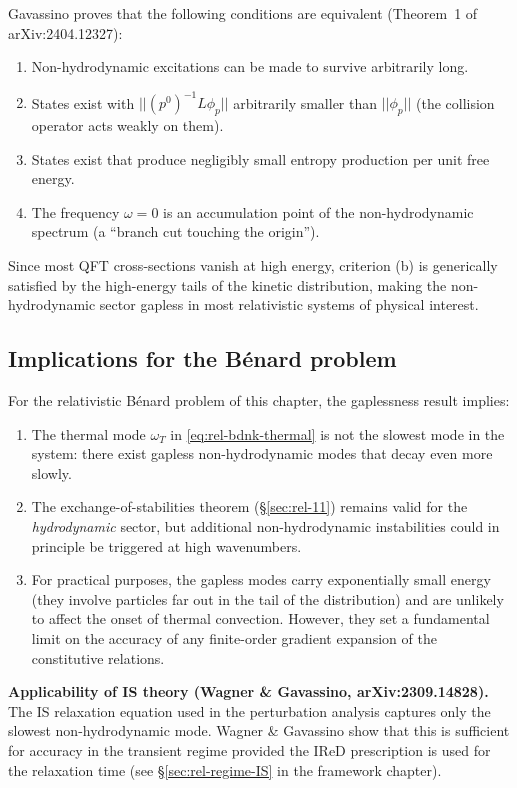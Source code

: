 Gavassino proves that the following conditions are equivalent (Theorem~1
of arXiv:2404.12327):
\begin{enumerate}
\item[(a)] Non-hydrodynamic excitations can be made to survive
  arbitrarily long.
\item[(b)] States exist with $||(p^0)^{-1}L\phi_p||$ arbitrarily
  smaller than $||\phi_p||$ (the collision operator acts weakly on them).
\item[(c)] States exist that produce negligibly small entropy production
  per unit free energy.
\item[(d)] The frequency $\omega = 0$ is an accumulation point of the
  non-hydrodynamic spectrum (a ``branch cut touching the origin'').
\end{enumerate}
Since most QFT cross-sections vanish at high energy, criterion (b) is
generically satisfied by the high-energy tails of the kinetic distribution,
making the non-hydrodynamic sector gapless in most relativistic systems
of physical interest.

\subsection{Implications for the B\'enard problem}

For the relativistic B\'enard problem of this chapter, the gaplessness
result implies:
\begin{enumerate}
\item The thermal mode $\omega_T$ in \eqref{eq:rel-bdnk-thermal} is
  not the slowest mode in the system: there exist gapless non-hydrodynamic
  modes that decay even more slowly.
\item The exchange-of-stabilities theorem (\S\ref{sec:rel-11}) remains
  valid for the \emph{hydrodynamic} sector, but additional non-hydrodynamic
  instabilities could in principle be triggered at high wavenumbers.
\item For practical purposes, the gapless modes carry exponentially
  small energy (they involve particles far out in the tail of the
  distribution) and are unlikely to affect the onset of thermal
  convection.  However, they set a fundamental limit on the accuracy
  of any finite-order gradient expansion of the constitutive relations.
\end{enumerate}

\medskip\noindent\textbf{Applicability of IS theory (Wagner \& Gavassino,
arXiv:2309.14828).}  The IS relaxation equation used in the perturbation
analysis captures only the slowest non-hydrodynamic mode.  Wagner \&
Gavassino show that this is sufficient for accuracy in the transient
regime provided the IReD prescription is used for the relaxation time
(see \S\ref{sec:rel-regime-IS} in the framework chapter).

